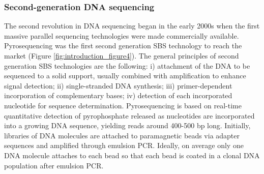 \subsubsection{Second-generation DNA sequencing}

The second revolution in \ac{DNA} sequencing began in the early 2000s when the first massive parallel sequencing technologies were made commercially available. Pyrosequencing \cite{nyren_solid_1993, ronaghi_real-time_1996, margulies_genome_2005} was the first second generation \ac{SBS} technology to reach the market (Figure \ref{fig:introduction_figure4}). The general principles of second generation \ac{SBS} technologies are the following: i) attachment of the \ac{DNA} to be sequenced to a solid support, usually combined with amplification to enhance signal detection; ii) single-stranded \ac{DNA} synthesis; iii) primer-dependent incorporation of complementary bases; iv) detection of each incorporated nucleotide for sequence determination. Pyrosequencing is based on real-time quantitative detection of pyrophosphate released as nucleotides are incorporated into a growing \ac{DNA} sequence, yielding reads around 400-500 \ac{bp} long. Initially, libraries of \ac{DNA} molecules are attached to paramagnetic beads via adapter sequences and amplified through emulsion \ac{PCR}. Ideally, on average only one \ac{DNA} molecule attaches to each bead so that each bead is coated in a clonal \ac{DNA} population after emulsion \ac{PCR}.

